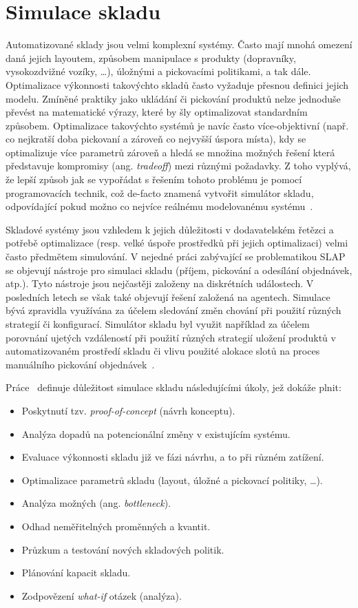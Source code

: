 \section{Simulace skladu}
Automatizované sklady jsou velmi komplexní systémy. Často mají mnohá omezení daná jejich layoutem, způsobem manipulace s produkty (dopravníky, vysokozdvižné vozíky, \ldots), úložnými a pickovacími politikami, a tak dále. Optimalizace výkonnosti takovýchto skladů často vyžaduje přesnou definici jejich modelu. Zmíněné praktiky jako ukládání či pickování produktů nelze jednoduše převést na matematické výrazy, které by šly optimalizovat standardním způsobem. Optimalizace takovýchto systémů je navíc často více-objektivní (např. co nejkratší doba pickovaní a zároveň co nejvyšší úspora místa), kdy se optimalizuje více parametrů zároveň a hledá se množina možných řešení která představuje kompromisy (ang. \emph{tradeoff}) mezi různými požadavky. Z toho vyplývá, že lepší způsob jak se vypořádat s řešením tohoto problému je pomocí programovacích technik, což de-facto znamená vytvořit simulátor skladu, odpovídající pokud možno co nejvíce reálnému modelovanému systému~\cite{whModelSim}.

Skladové systémy jsou vzhledem k jejich důležitosti v dodavatelském řetězci a potřebě optimalizace (resp. velké úspoře prostředků při jejich optimalizaci) velmi často předmětem simulování. V nejedné práci zabývající se problematikou SLAP se objevují nástroje pro simulaci skladu (příjem, pickování a odesílání objednávek, atp.). Tyto nástroje jsou nejčastěji založeny na diskrétních událostech. V posledních letech se však také objevují řešení založená na agentech. Simulace bývá zpravidla využívána za účelem sledování změn chování při použití různých strategií či konfigurací. Simulátor skladu byl využit například za účelem porovnání ujetých vzdáleností při použití různých strategií uložení produktů v automatizovaném prostředí skladu či vlivu použité alokace slotů na proces manuálního pickování objednávek~\cite{slapReview}.

Práce~\cite{whModelSim} definuje důležitost simulace skladu následujícími úkoly, jež dokáže plnit:

\begin{itemize}
    \item Poskytnutí tzv. \emph{proof-of-concept} (návrh konceptu).
    \item Analýza dopadů na potencionální změny v existujícím systému.
    \item Evaluace výkonnosti skladu již ve fázi návrhu, a to při různém zatížení.
    \item Optimalizace parametrů skladu (layout, úložné a pickovací politiky, \ldots).
    \item Analýza možných  (ang. \emph{bottleneck}).
    \item Odhad neměřitelných proměnných a kvantit.
    \item Průzkum a testování nových skladových politik.
    \item Plánování kapacit skladu.
    \item Zodpovězení \emph{what-if} otázek (analýza).
\end{itemize}

